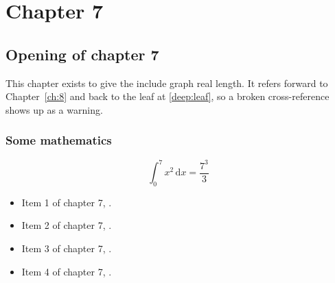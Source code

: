 \chapter{Chapter 7}
\label{ch:7}
\section{Opening of chapter 7}
This chapter exists to give the include graph real length. It refers
forward to Chapter~\ref{ch:8} and back to the leaf
at \ref{deep:leaf}, so a broken cross-reference shows up as a warning.

\subsection{Some mathematics}
\begin{equation}
  \int_0^{7} x^{2} \, \mathrm{d}x = \frac{7^{3}}{3}
\end{equation}

\begin{itemize}
  \item Item 1 of chapter 7, .
  \item Item 2 of chapter 7, .
  \item Item 3 of chapter 7, .
  \item Item 4 of chapter 7, .
\end{itemize}
